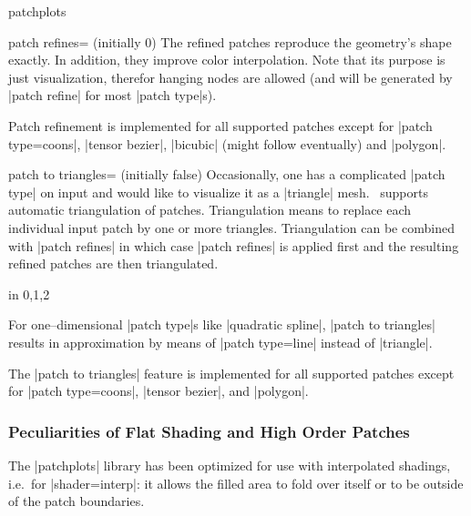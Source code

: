 {\begin{pgfplotslibrary}{patchplots}
\begin{pgfplotskey}{patch refines= (initially 0)}
	The refined patches reproduce the geometry's shape exactly. In addition, they improve color interpolation. Note that its purpose is just visualization, therefor hanging nodes are allowed (and will be generated by |patch refine| for most |patch type|s).

	Patch refinement is implemented for all supported patches except for |patch type=coons|, |tensor bezier|, |bicubic| (might follow eventually) and |polygon|.
\end{pgfplotskey}

\begin{pgfplotskey}{patch to triangles= (initially false)}
	Occasionally, one has a complicated |patch type| on input and would like to visualize it as a |triangle| mesh. \PGFPlots\ supports automatic triangulation of patches. Triangulation means to replace each individual input patch by one or more triangles. Triangulation can be combined with |patch refines| in which case |patch refines| is applied first and the resulting refined patches are then triangulated.
\begin{codeexample}[]
\foreach \level in {0,1,2} {%
}
\end{codeexample}
	
	For one--dimensional |patch type|s like |quadratic spline|, |patch to triangles| results in approximation by means of |patch type=line| instead of |triangle|. 

	The |patch to triangles| feature is implemented for all supported patches except for |patch type=coons|, |tensor bezier|, and |polygon|.
\end{pgfplotskey}

\subsubsection{Peculiarities of Flat Shading and High Order Patches}
\label{sec:lib:patchplots:flat}
The |patchplots| library has been optimized for use with interpolated shadings, i.e.\ for |shader=interp|: it allows the filled area to fold over itself or to be outside of the patch boundaries.


\end{pgfplotslibrary}}
